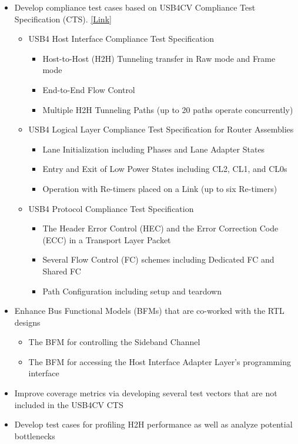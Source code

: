 \documentclass{cvclass}
\begin{document}
{\begin{itemize}
\begin{itemize}
            \item Develop compliance test cases based on USB4CV Compliance Test Specification (CTS). \href{https://www.usb.org/document-library/usb4cv-compliance-test-specification}{[Link]}
            \begin{itemize}
                \item USB4\texttrademark{} Host Interface Compliance Test Specification
                \begin{itemize}
                    \item Host-to-Host (H2H) Tunneling transfer in Raw mode and Frame mode
                    \item End-to-End Flow Control
                    \item Multiple H2H Tunneling Paths (up to 20 paths operate concurrently)
                \end{itemize}
                \item USB4\texttrademark{} Logical Layer Compliance Test Specification for Router Assemblies
                \begin{itemize}
                    \item Lane Initialization including Phases and Lane Adapter States
                    \item Entry and Exit of Low Power States including CL2, CL1, and CL0s
                    \item Operation with Re-timers placed on a Link (up to six Re-timers)
                \end{itemize}
                \item USB4\texttrademark{} Protocol Compliance Test Specification
                \begin{itemize}
                    \item The Header Error Control (HEC) and the Error Correction Code (ECC) in a Transport Layer Packet
                    \item Several Flow Control (FC) schemes including Dedicated FC and Shared FC
                    \item Path Configuration including setup and teardown 
                \end{itemize}
            \end{itemize}
            \item Enhance Bus Functional Models (BFMs) that are co-worked with the RTL designs
            \begin{itemize}
                \item The BFM for controlling the Sideband Channel
                \item The BFM for accessing the Host Interface Adapter Layer's programming interface
            \end{itemize}
            \item Improve coverage metrics via developing several test vectors that are not included in the USB4CV CTS
            \item Develop test cases for profiling H2H performance as well as analyze potential bottlenecks
        \end{itemize}
    \end{itemize}}
\end{document}
